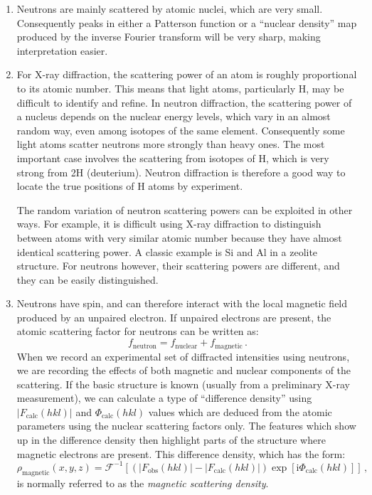 \documentclass{article}
\theoremstyle{plain}\theoremheaderfont{\normalfont\itshape}\theorembodyfont{\rmfamily}\theoremseparator{.}\newtheorem*{rem}{Remark}\newtheorem*{ex}{Example}\newtheorem*{proof}{Proof}\newtheorem*{altp}{Alternative proof}
\theoremstyle{plain}\theoremheaderfont{\normalfont\bfseries}\theorembodyfont{\rmfamily}\theoremseparator{.}\newtheorem{thm}{Theorem}[section]\newtheorem{lem}[thm]{Lemma}\newtheorem{prop}[thm]{Proposition}\newtheorem*{cor}{Corollary}\newtheorem{defn}[thm]{Definition}\newtheorem{clm}[thm]{Claim}\newtheorem{clminproof}{Claim}\newtheorem*{law}{Law}\newtheorem{pos}[thm]{Postulate}
\theoremstyle{break}\theoremheaderfont{\normalfont\itshape}\theorembodyfont{\rmfamily}\theoremseparator{.\medskip}\newtheorem*{proofskip}{Proof}\newtheorem*{exs}{Examples}\newtheorem*{rems}{Remarks}
\theoremstyle{break}\theoremheaderfont{\normalfont\bfseries}\theorembodyfont{\rmfamily}\theoremseparator{.\medskip}\newtheorem{lemskip}[thm]{Lemma}\newtheorem{defnskip}[thm]{Definition}\newtheorem{propskip}[thm]{Proposition}\newtheorem{thmskip}[thm]{Theorem}
\numberwithin{equation}{section}
\newcommand{\ii}{\mathrm{i}}
\newcommand{\abs}[1]{\left| #1 \right|}
\begin{document}
    \begin{enumerate}
        \item Neutrons are mainly scattered by atomic nuclei, which are very small. Consequently peaks in either a Patterson function or a ``nuclear density'' map produced by the inverse Fourier transform will be very sharp, making interpretation easier.
        \item For X-ray diffraction, the scattering power of an atom is roughly proportional to its atomic number. This means that light atoms, particularly H, may be difficult to identify and refine. In neutron diffraction, the scattering power of a nucleus depends on the nuclear energy levels, which vary in an almost random way, even among isotopes of the same element. Consequently some light atoms scatter neutrons more strongly than heavy ones. The most important case involves the scattering from isotopes of H, which is very strong from 2H (deuterium). Neutron diffraction is therefore a good way to locate the true positions of H atoms by experiment.
        
        The random variation of neutron scattering powers can be exploited in other ways. For example, it is difficult using X-ray diffraction to distinguish between atoms with very similar atomic number because they have almost identical scattering power. A classic example is Si and Al in a zeolite structure. For neutrons however, their scattering powers are different, and they can be easily distinguished.
        \item Neutrons have spin, and can therefore interact with the local magnetic field produced by an unpaired electron. If unpaired electrons are present, the atomic scattering factor for neutrons can be written as:
        \begin{equation}
            f_{\text{neutron}} = f_{\text{nuclear}} + f_{\text{magnetic}}\,. 
        \end{equation}
        When we record an experimental set of diffracted intensities using neutrons, we are recording the effects of both magnetic and nuclear components of the scattering. If the basic structure is known (usually from a preliminary X-ray measurement), we can calculate a type of ``difference density'' using \(\abs{F_{\text{calc}}(hkl)}\) and \(\Phi_{\text{calc}}(hkl)\) values which are deduced from the atomic parameters using the nuclear scattering factors only. The features which show up in the difference density then highlight parts of the structure where magnetic electrons are present. This difference density, which has the form:
        \begin{equation}
            \rho_{\text{magnetic}}(x,y,z)=\mathcal{F}^{-1}\left[(\abs{F_{\text{obs}}(hkl)}-\abs{F_{\text{calc}}(hkl)})\exp[\ii\Phi_{\text{calc}}(hkl)]\right]\,,
        \end{equation}
        is normally referred to as the \textit{magnetic scattering density}. 
    \end{enumerate}
\end{document}
